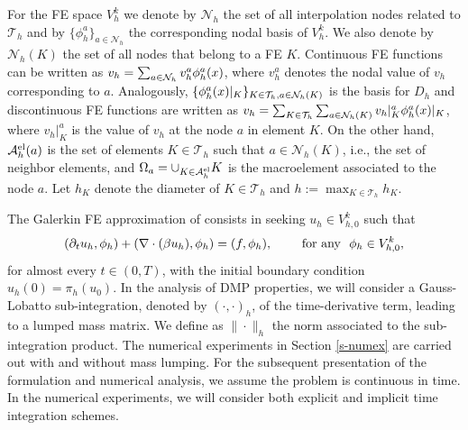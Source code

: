 For the FE space $V_h^k$ we denote by $\mathcal{N}_h$ the set of all interpolation nodes related to $\mathcal{T}_h$ and by $\{\phi^a_h\}_{a \in \mathcal{N}_h}$ the corresponding nodal basis of $V_h^k$. We also denote by $\mathcal{N}_h(K)$ the set of all nodes that belong to a FE $K$. Continuous FE functions can be written as $v_h = \sum_{a \in \mathcal{N}_h} v_h^a \phi^a_h(x)$, where $v_h^a$ denotes the nodal value of $v_h$ corresponding to $a$. Analogously, $\{\phi^a_h(x)|_K\}_{K \in \mathcal{T}_h, a \in \mathcal{N}_h(K)}$ is the basis for $D_h$ and discontinuous FE functions  are written as $v_h = \sum_{K \in \mathcal{T}_h} \sum_{a \in \mathcal{N}_h(K)} v_h|_K^a \phi^a_h(x)|_K$, where $v_h|_K^a$ is the value of $v_h$ at the node $a$ in element $K$.  
On the other hand, $\mathcal{A}_h^{\rm el}(a)$ is the set of elements $K \in \mathcal{T}_h$ such that $a \in \mathcal{N}_h(K)$, i.e., the set of neighbor elements, and $\Omega_a = \cup_{K\in\mathcal{A}_h^{\rm el}} K$ is the macroelement associated to the node $a$. Let  $h_K$ denote the diameter of $K\in\mathcal{T}_h$ and $h := \max_{K\in\mathcal{T}_h} h_K$. 

The Galerkin FE approximation of  consists in seeking $u_h \in V^k_{h,0}$ such that
\begin{equation}\label{eq-galerkin}
(\partial_t u_h,\phi_h) +   (\nabla \cdot (\beta u_h),\phi_h) =  (f , \phi_h ) , \qquad \hbox{ for any }  \ \phi_h \in V^k_{h,0}, 
\end{equation}
for almost every $t \in (0,T)$, with the initial boundary condition $u_h(0) = \pi_h(u_0)$. In the analysis of DMP properties, we will consider a Gauss-Lobatto sub-integration, denoted by $(\cdot,\cdot)_h$, of the time-derivative term, leading to a lumped mass matrix. We define as $\|\cdot \|_h$ the norm associated to the sub-integration product. The numerical experiments in Section \ref{s-numex} are carried out with and without mass lumping. For the subsequent presentation of the formulation and numerical analysis, we assume the problem is continuous in time. In the numerical experiments, we will consider both explicit and implicit time integration schemes.

